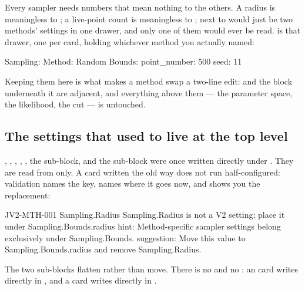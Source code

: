 Every sampler needs numbers that mean nothing to the others. A radius is meaningless to
; a live-point count is meaningless to ; 
next to  would just be two methods' settings in one drawer, and only
one of them would ever be read.  is that drawer, one per card, holding
whichever method you actually named:

\begin{yamlwin}
Sampling:
  Method: Random
  Bounds:
    point_number: 500
    seed: 11
\end{yamlwin}

Keeping them here is what makes a method swap a two-line edit:  and the
block underneath it are adjacent, and everything above them --- the parameter space, the
likelihood, the cut --- is untouched.

\subsection*{The settings that used to live at the top level}

, , , ,
, the  sub-block, and the  sub-block
were once written directly under . They are read from 
only. A card written the old way does not run half-configured: validation names the key,
names where it goes now, and shows you the replacement:

\begin{terminal}
\begin{jout}
[error] JV2-MTH-001  Sampling.Radius
    Sampling.Radius is not a V2 setting; place it under
    Sampling.Bounds.radius
    hint: Method-specific sampler settings belong exclusively
          under Sampling.Bounds.
    suggestion: Move this value to Sampling.Bounds.radius and
                remove Sampling.Radius.
\end{jout}
\end{terminal}

The two sub-blocks flatten rather than move. There is no
 and no : an
 card writes  directly in
, and a  card writes  directly in
.

\subsection*{}

